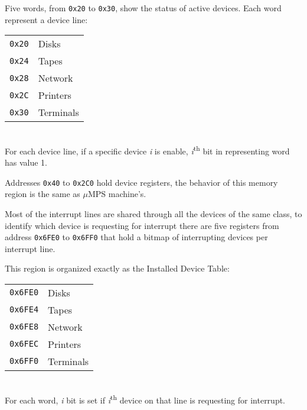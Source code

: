 
Five words, from \texttt{0x20} to \texttt{0x30}, show the status of active devices. Each word represent a device line:
\\

\begin{tabular}{r|l}
\texttt{0x20} & Disks \\
\texttt{0x24} & Tapes \\
\texttt{0x28} & Network \\
\texttt{0x2C} & Printers \\
\texttt{0x30} & Terminals \\
\end{tabular}
\\

For each device line, if a specific device \emph{i} is enable, \emph{i}\textsuperscript{th} bit in representing word has value 1.

Addresses \texttt{0x40} to \texttt{0x2C0} hold device registers, the behavior of this memory region is the same as $\mu$MPS machine's.

Most of the interrupt lines are shared through all the devices of the same class, to identify which device is requesting for interrupt there are five registers from address \texttt{0x6FE0} to \texttt{0x6FF0} that hold a bitmap of interrupting devices per interrupt line.

This region is organized exactly as the Installed Device Table:
\\

\begin{tabular}{r|l}
\texttt{0x6FE0} & Disks \\
\texttt{0x6FE4} & Tapes \\
\texttt{0x6FE8} & Network \\
\texttt{0x6FEC} & Printers \\
\texttt{0x6FF0} & Terminals \\
\end{tabular}
\\

For each word, \emph{i} bit is set if \emph{i}\textsuperscript{th} device on that line is requesting for interrupt.


